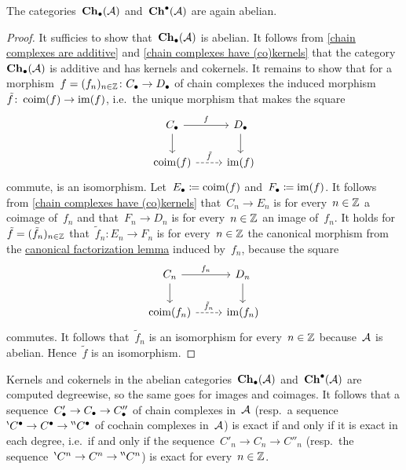 

\begin{theorem}
  The categories~$\mathbf{Ch}_\bullet(\mathcal{A})$ and~$\mathbf{Ch}^\bullet(\mathcal{A})$ are again abelian.
\end{theorem}


\begin{proof}
  It sufficies to show that~$\mathbf{Ch}_\bullet(\mathcal{A})$ is abelian.
  It follows from \cref{chain complexes are additive} and \cref{chain complexes have (co)kernels} that the category~$\mathbf{Ch}_\bullet(\mathcal{A})$ is additive and has kernels and cokernels.
  It remains to show that for a morphism~$f = (f_n)_{n \in \mathbb{Z}} \colon C_\bullet \to D_\bullet$ of chain complexes the induced morphism~$\tilde{f} \colon \operatorname{coim}(f) \to \operatorname{im}(f)$, i.e.\ the unique morphism that makes the square
  \[
    \begin{tikzcd}
        \Ccc
        \arrow{r}[above]{f}
        \arrow{d}
      & \Dcc
        \arrow{d}
      \\
        \coim(f)
        \arrow[dashed]{r}[above]{\tilde{f}}
      & \im(f)
    \end{tikzcd}
  \]
  commute, is an isomorphism.
  Let~$E_\bullet \coloneqq \operatorname{coim}(f)$ and~$F_\bullet \coloneqq \operatorname{im}(f)$.
  It follows from \cref{chain complexes have (co)kernels} that~$C_n \to E_n$ is for every~$n \in \mathbb{Z}$ a coimage of~$f_n$ and that~$F_n \to D_n$ is for every~$n \in \mathbb{Z}$ an image of~$f_n$.
  It holds for~$\tilde{f} = (\tilde{f}_n)_{n \in \mathbb{Z}}$ that~$\tilde{f}_n \colon E_n \to F_n$ is for every~$n \in \mathbb{Z}$ the canonical morphism from the \hyperref[canonical factorization]{canonical factorization lemma} induced by~$f_n$, because the square
  \[
    \begin{tikzcd}
        C_n
        \arrow{r}[above]{f_n}
        \arrow{d}
      & D_n
        \arrow{d}
      \\
        \coim(f_n)
        \arrow[dashed]{r}[above]{\tilde{f}_n}
      & \im(f_n)
    \end{tikzcd}
  \]
  commutes.
  It follows that~$\tilde{f}_n$ is an isomorphism for every~$n \in \mathbb{Z}$ because~$\mathcal{A}$ is abelian.
  Hence~$\tilde{f}$ is an isomorphism.
\end{proof}


\begin{remark*}
  \label{exactness for chain complexes is computed degreewise}
  Kernels and cokernels in the abelian categories~$\mathbf{Ch}_\bullet(\mathcal{A})$ and~$\mathbf{Ch}^\bullet(\mathcal{A})$ are computed degreewise, so the same goes for images and coimages.
  It follows that a sequence~$C_\bullet' \to C_\bullet \to C_\bullet''$ of chain complexes in~$\mathcal{A}$ (resp.\ a sequence~${}^{\backprime}C^\bullet \to C^\bullet \to {}^{\backprime \backprime}C^\bullet$ of cochain complexes in~$\mathcal{A}$) is exact if and only if it is exact in each degree, i.e.\ if and only if the sequence~$C'_n \to C_n \to C''_n$ (resp.\ the sequence~${}^{\backprime} C^n \to C^n \to {}^{\backprime \backprime} C^n$) is exact for every~$n \in \mathbb{Z}$.
\end{remark*}




